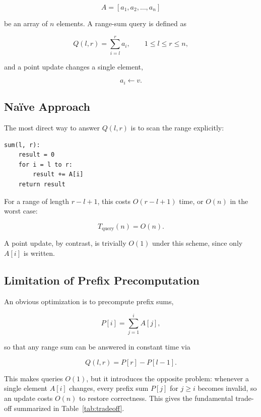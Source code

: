 \documentclass[11pt,open=any]{scrreprt}
\begin{document}
\begin{equation}
A = [a_1, a_2, \ldots, a_n]
\end{equation}

be an array of $n$ elements. A range-sum query is defined as

\begin{equation}
Q(l,r) = \sum_{i=l}^{r} a_i, \qquad 1 \le l \le r \le n,
\end{equation}

and a point update changes a single element,

\begin{equation}
a_i \leftarrow v.
\end{equation}

\subsection{Na\"ive Approach}
The most direct way to answer $Q(l,r)$ is to scan the range explicitly:

\begin{lstlisting}
sum(l, r):
    result = 0
    for i = l to r:
        result += A[i]
    return result
\end{lstlisting}

For a range of length $r-l+1$, this costs $O(r-l+1)$ time, or $O(n)$ in the worst case:

\begin{equation}
T_{\text{query}}(n) = O(n).
\end{equation}

A point update, by contrast, is trivially $O(1)$ under this scheme, since only $A[i]$ is written.

\subsection{Limitation of Prefix Precomputation}
An obvious optimization is to precompute prefix sums,

\begin{equation}
P[i] = \sum_{j=1}^{i} A[j],
\end{equation}

so that any range sum can be answered in constant time via

\begin{equation}
Q(l,r) = P[r] - P[l-1].
\end{equation}

This makes queries $O(1)$, but it introduces the opposite problem: whenever a single element $A[i]$ changes, every prefix sum $P[j]$ for $j \ge i$ becomes invalid, so an update costs $O(n)$ to restore correctness. This gives the fundamental trade-off summarized in Table~\ref{tab:tradeoff}.
\end{document}
